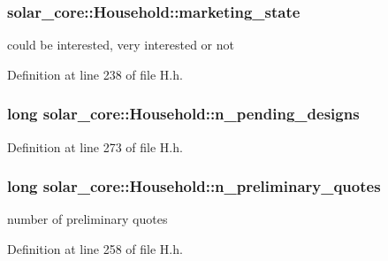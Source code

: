 \subsubsection[{marketing\+\_\+state}]{ solar\+\_\+core\+::\+Household\+::marketing\+\_\+state\hspace{0.3cm}{\ttfamily [protected]}}\label{classsolar__core_1_1_household_a3ee8b2654cad46236d11f85a4ccd9574}
could be interested, very interested or not 

Definition at line 238 of file H.\+h.

\hypertarget{classsolar__core_1_1_household_ac82a6ebca38ecaf971845f6fa5791559}{}
\subsubsection[{n\+\_\+pending\+\_\+designs}]{\setlength{\rightskip}{0pt plus 5cm}long solar\+\_\+core\+::\+Household\+::n\+\_\+pending\+\_\+designs\hspace{0.3cm}{\ttfamily [protected]}}\label{classsolar__core_1_1_household_ac82a6ebca38ecaf971845f6fa5791559}


Definition at line 273 of file H.\+h.

\hypertarget{classsolar__core_1_1_household_aedfc08b7837a3e2fa6ad9e62309694f3}{}
\subsubsection[{n\+\_\+preliminary\+\_\+quotes}]{\setlength{\rightskip}{0pt plus 5cm}long solar\+\_\+core\+::\+Household\+::n\+\_\+preliminary\+\_\+quotes\hspace{0.3cm}{\ttfamily [protected]}}\label{classsolar__core_1_1_household_aedfc08b7837a3e2fa6ad9e62309694f3}
number of preliminary quotes 

Definition at line 258 of file H.\+h.

\hypertarget{classsolar__core_1_1_household_a41d61dc3bab971cb19170341b77d9df8}{}
